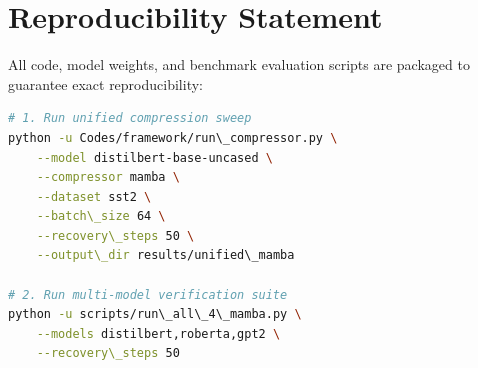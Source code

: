 \section{Reproducibility Statement}
All code, model weights, and benchmark evaluation scripts are packaged to guarantee exact reproducibility:
\begin{lstlisting}[language=bash]
# 1. Run unified compression sweep
python -u Codes/framework/run\_compressor.py \
    --model distilbert-base-uncased \
    --compressor mamba \
    --dataset sst2 \
    --batch\_size 64 \
    --recovery\_steps 50 \
    --output\_dir results/unified\_mamba

# 2. Run multi-model verification suite
python -u scripts/run\_all\_4\_mamba.py \
    --models distilbert,roberta,gpt2 \
    --recovery\_steps 50
\end{lstlisting}
